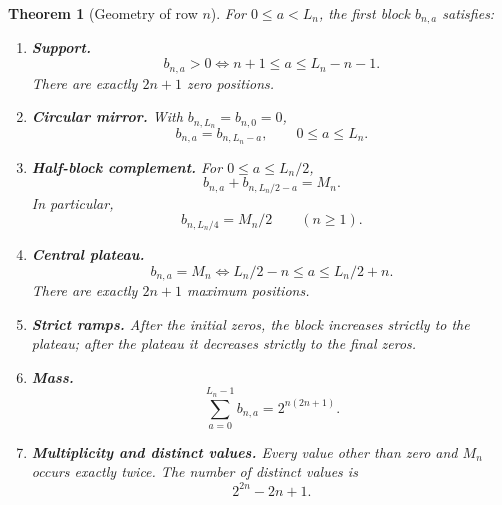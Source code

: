 \documentclass[11pt,oneside]{article}
\numberwithin{equation}{section}
\newtheorem{theorem}{Theorem}[section]
\theoremstyle{definition}
\theoremstyle{remark}
\begin{document}
\begin{theorem}[Geometry of row \(n\)]
For \(0\le a<L_n\), the first block \(b_{n,a}\) satisfies:

\begin{enumerate}
\item \textbf{Support.}
\begin{equation}
 b_{n,a}>0
 \iff
 n+1\le a\le L_n-n-1.
 \label{p3:a:eq:row-support}
\end{equation}
There are exactly \(2n+1\) zero positions.

\item \textbf{Circular mirror.}
With \(b_{n,L_n}=b_{n,0}=0\),
\begin{equation}
 \boxed{b_{n,a}=b_{n,L_n-a},\qquad 0\le a\le L_n.}
 \label{p3:a:eq:row-mirror}
\end{equation}

\item \textbf{Half-block complement.}
For \(0\le a\le L_n/2\),
\begin{equation}
 \boxed{b_{n,a}+b_{n,L_n/2-a}=M_n.}
 \label{p3:a:eq:row-complement}
\end{equation}
In particular,
\begin{equation}
 b_{n,L_n/4}=M_n/2
 \qquad(n\ge1).
 \label{p3:a:eq:quarter-value}
\end{equation}

\item \textbf{Central plateau.}
\begin{equation}
 \boxed{
 b_{n,a}=M_n
 \iff
 L_n/2-n\le a\le L_n/2+n.}
 \label{p3:a:eq:row-plateau}
\end{equation}
There are exactly \(2n+1\) maximum positions.

\item \textbf{Strict ramps.}  After the initial zeros, the block increases
strictly to the plateau; after the plateau it decreases strictly to the final
zeros.

\item \textbf{Mass.}
\begin{equation}
 \boxed{
 \sum_{a=0}^{L_n-1}b_{n,a}=2^{n(2n+1)}.}
 \label{p3:a:eq:row-mass}
\end{equation}

\item \textbf{Multiplicity and distinct values.}  Every value other than
zero and \(M_n\) occurs exactly twice.  The number of distinct values is
\begin{equation}
 \boxed{2^{2n}-2n+1.}
 \label{p3:a:eq:row-distinct}
\end{equation}
\end{enumerate}
\end{theorem}
\end{document}
